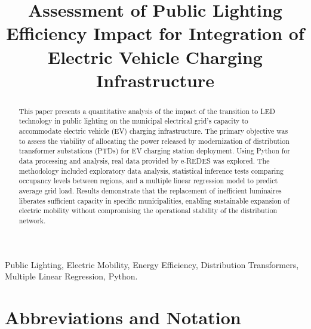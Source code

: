 \documentclass[conference]{IEEEtran}
\begin{document}
\title{Assessment of Public Lighting Efficiency Impact for Integration of Electric Vehicle Charging Infrastructure}

\author{
\and
{}
\and
{}
}

\maketitle

\begin{abstract}
This paper presents a quantitative analysis of the impact of the transition to LED technology in public lighting on the municipal electrical grid's capacity to accommodate electric vehicle (EV) charging infrastructure. The primary objective was to assess the viability of allocating the power released by modernization of distribution transformer substations (PTDs) for EV charging station deployment. Using Python for data processing and analysis, real data provided by e-REDES was explored. The methodology included exploratory data analysis, statistical inference tests comparing occupancy levels between regions, and a multiple linear regression model to predict average grid load. Results demonstrate that the replacement of inefficient luminaires liberates sufficient capacity in specific municipalities, enabling sustainable expansion of electric mobility without compromising the operational stability of the distribution network.
\end{abstract}

\begin{IEEEkeywords}
Public Lighting, Electric Mobility, Energy Efficiency, Distribution Transformers, Multiple Linear Regression, Python.
\end{IEEEkeywords}

\section*{Abbreviations and Notation}
\label{sec:abbrev}
\end{document}
